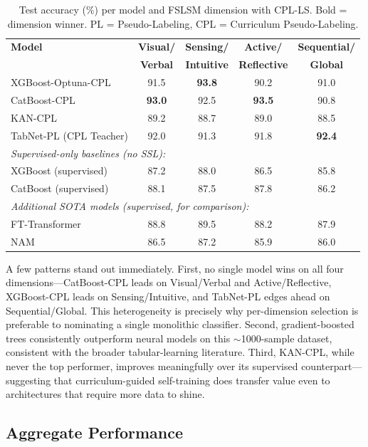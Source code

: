 \documentclass[journal, onecolumn]{IEEEtran}
\begin{document}
\begin{table}[!htbp]
\centering
\small
\caption{Test accuracy (\%) per model and FSLSM dimension with CPL-LS. Bold = dimension winner. PL = Pseudo-Labeling, CPL = Curriculum Pseudo-Labeling.}
\label{tab:results}
\begin{tabular}{@{}lcccc@{}}
\toprule
\textbf{Model} & \textbf{Visual/} & \textbf{Sensing/} & \textbf{Active/} & \textbf{Sequential/} \\
 & \textbf{Verbal} & \textbf{Intuitive} & \textbf{Reflective} & \textbf{Global} \\
\midrule
XGBoost-Optuna-CPL & 91.5 & \textbf{93.8} & 90.2 & 91.0 \\
CatBoost-CPL        & \textbf{93.0} & 92.5 & \textbf{93.5} & 90.8 \\
KAN-CPL             & 89.2 & 88.7 & 89.0 & 88.5 \\
TabNet-PL (CPL Teacher) & 92.0 & 91.3 & 91.8 & \textbf{92.4} \\
\midrule
\multicolumn{5}{l}{\textit{Supervised-only baselines (no SSL):}} \\
XGBoost (supervised) & 87.2 & 88.0 & 86.5 & 85.8 \\
CatBoost (supervised) & 88.1 & 87.5 & 87.8 & 86.2 \\
\midrule
\multicolumn{5}{l}{\textit{Additional SOTA models (supervised, for comparison):}} \\
FT-Transformer     & 88.8 & 89.5 & 88.2 & 87.9 \\
NAM                & 86.5 & 87.2 & 85.9 & 86.0 \\
\bottomrule
\end{tabular}
\end{table}

A few patterns stand out immediately. First, no single model wins on all four dimensions---CatBoost-CPL leads on Visual/Verbal and Active/Reflective, XGBoost-CPL leads on Sensing/Intuitive, and TabNet-PL edges ahead on Sequential/Global. This heterogeneity is precisely why per-dimension selection is preferable to nominating a single monolithic classifier. Second, gradient-boosted trees consistently outperform neural models on this $\sim$1000-sample dataset, consistent with the broader tabular-learning literature. Third, KAN-CPL, while never the top performer, improves meaningfully over its supervised counterpart---suggesting that curriculum-guided self-training does transfer value even to architectures that require more data to shine.

\subsection{Aggregate Performance}
\end{document}
